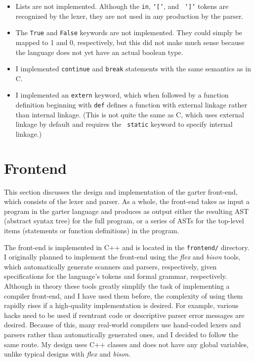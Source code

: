 \documentclass[11pt]{article}
\begin{document}
\begin{itemize}
    \item Lists are not implemented.  Although the {\tt in}, {\tt `['}, and {\tt
        `]'} tokens are recognized by the lexer, they are not used in any
        production by the parser.
    \item The {\tt True} and {\tt False} keywords are not implemented.  They
        could simply be mapped to 1 and 0, respectively, but this did not make
        much sense because the language does not yet have an actual boolean type.
    \item I implemented {\tt continue} and {\tt break} statements with the same
        semantics as in C.
    \item I implemented an {\tt extern} keyword, which when followed by a
        function definition beginning with {\tt def} defines a function with
        external linkage rather than internal linkage.  (This is not quite the
        same as C, which uses external linkage by default and requires the {\tt
        static} keyword to specify internal linkage.)
\end{itemize}

\section{Frontend}

This section discusses the design and implementation of the garter front-end,
which consists of the lexer and parser.  As a whole, the front-end takes as input
a program in the garter language and produces as output either the resulting
AST (abstract syntax tree) for the full program, or a series of ASTs for the
top-level items (statements or function definitions) in the program.

The front-end is implemented in C++ and is located in the {\tt frontend/}
directory.  I originally planned to implement the front-end using the {\em flex}
and {\em bison} tools, which automatically generate scanners and parsers,
respectively, given specifications for the language's tokens and formal grammar,
respectively.  Although in theory these tools greatly simplify the task of
implementing a compiler front-end, and I have used them before, the complexity
of using them rapidly rises if a high-quality implementation is desired.  For
example, various hacks need to be used if reentrant code or descriptive parser
error messages are desired.  Because of this, many real-world compilers use
hand-coded lexers and parsers rather than automatically generated ones, and I
decided to follow the same route.  My design uses C++ classes and does not have
any global variables, unlike typical designs with {\em flex} and {\em bison}.
\end{document}
